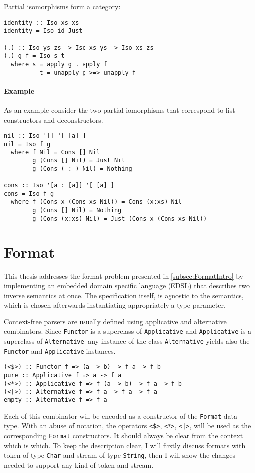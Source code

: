 \documentclass[../Thesis.tex]{subfiles}
\begin{document}
Partial isomorphisms form a category:
\begin{verbatim}
identity :: Iso xs xs
identity = Iso id Just

(.) :: Iso ys zs -> Iso xs ys -> Iso xs zs
(.) g f = Iso s t
  where s = apply g . apply f
          t = unapply g >=> unapply f
\end{verbatim}

\paragraph{Example} 
As an example consider the two partial iomorphisms that correspond
to list constructors and deconstructors. 

\begin{verbatim}
nil :: Iso '[] '[ [a] ]
nil = Iso f g
  where f Nil = Cons [] Nil
        g (Cons [] Nil) = Just Nil
        g (Cons (_:_) Nil) = Nothing

cons :: Iso '[a : [a]] '[ [a] ]
cons = Iso f g
  where f (Cons x (Cons xs Nil)) = Cons (x:xs) Nil
        g (Cons [] Nil) = Nothing
        g (Cons (x:xs) Nil) = Just (Cons x (Cons xs Nil))
\end{verbatim}

\section{Format}
\label{sec:Format}
This thesis addresses the format problem presented in \ref{subsec:FormatIntro} by implementing an embedded domain specific language (EDSL) that describes two inverse semantics at once.
The specification itself, is agnostic to the semantics, which is chosen afterwards instantiating appropriately a type parameter.

Context-free parsers are usually defined using applicative 
and alternative combinators. Since \texttt{Functor} is a superclass of \texttt{Applicative} and \texttt{Applicative} is a superclass of \texttt{Alternative}, any instance of the class \texttt{Alternative} yields
also the \texttt{Functor} and \texttt{Applicative} instances.

\begin{verbatim}
(<$>) :: Functor f => (a -> b) -> f a -> f b
pure :: Applicative f => a -> f a
(<*>) :: Applicative f => f (a -> b) -> f a -> f b
(<|>) :: Alternative f => f a -> f a -> f a
empty :: Alternative f => f a
\end{verbatim} 

Each of this combinator will be encoded as a constructor of the \texttt{Format} data type. With an abuse of notation, the operators \texttt{<\$>}, \texttt{<*>}, \texttt{<|>}, will be used as the corresponding \texttt{Format} constructors. 
It should always be clear from the context which is which. 
To keep the description clear, I will firstly discuss formats with token of type \texttt{Char} and stream of type \texttt{String}, then I will show the changes needed to support any kind of token and stream.
\end{document}
